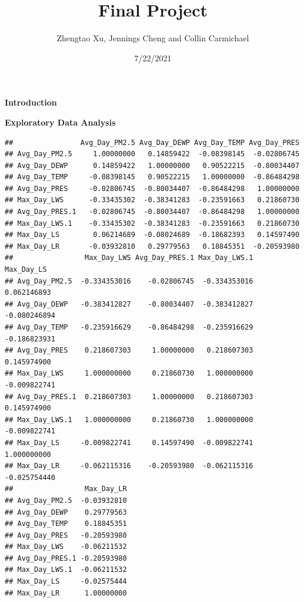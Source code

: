 \documentclass[
]{article}
\title{Final Project}
\author{Zhengtao Xu, Jennings Cheng and Collin Carmichael}
\date{7/22/2021}
\begin{document}
\maketitle

\textbf{Introduction}

\textbf{Exploratory Data Analysis}

\begin{verbatim}
##                Avg_Day_PM2.5 Avg_Day_DEWP Avg_Day_TEMP Avg_Day_PRES
## Avg_Day_PM2.5     1.00000000   0.14859422  -0.08398145  -0.02806745
## Avg_Day_DEWP      0.14859422   1.00000000   0.90522215  -0.80034407
## Avg_Day_TEMP     -0.08398145   0.90522215   1.00000000  -0.86484298
## Avg_Day_PRES     -0.02806745  -0.80034407  -0.86484298   1.00000000
## Max_Day_LWS      -0.33435302  -0.38341283  -0.23591663   0.21860730
## Avg_Day_PRES.1   -0.02806745  -0.80034407  -0.86484298   1.00000000
## Max_Day_LWS.1    -0.33435302  -0.38341283  -0.23591663   0.21860730
## Max_Day_LS        0.06214689  -0.08024689  -0.18682393   0.14597490
## Max_Day_LR       -0.03932810   0.29779563   0.18845351  -0.20593980
##                 Max_Day_LWS Avg_Day_PRES.1 Max_Day_LWS.1   Max_Day_LS
## Avg_Day_PM2.5  -0.334353016    -0.02806745  -0.334353016  0.062146893
## Avg_Day_DEWP   -0.383412827    -0.80034407  -0.383412827 -0.080246894
## Avg_Day_TEMP   -0.235916629    -0.86484298  -0.235916629 -0.186823931
## Avg_Day_PRES    0.218607303     1.00000000   0.218607303  0.145974900
## Max_Day_LWS     1.000000000     0.21860730   1.000000000 -0.009822741
## Avg_Day_PRES.1  0.218607303     1.00000000   0.218607303  0.145974900
## Max_Day_LWS.1   1.000000000     0.21860730   1.000000000 -0.009822741
## Max_Day_LS     -0.009822741     0.14597490  -0.009822741  1.000000000
## Max_Day_LR     -0.062115316    -0.20593980  -0.062115316 -0.025754440
##                 Max_Day_LR
## Avg_Day_PM2.5  -0.03932810
## Avg_Day_DEWP    0.29779563
## Avg_Day_TEMP    0.18845351
## Avg_Day_PRES   -0.20593980
## Max_Day_LWS    -0.06211532
## Avg_Day_PRES.1 -0.20593980
## Max_Day_LWS.1  -0.06211532
## Max_Day_LS     -0.02575444
## Max_Day_LR      1.00000000
\end{verbatim}
\end{document}
